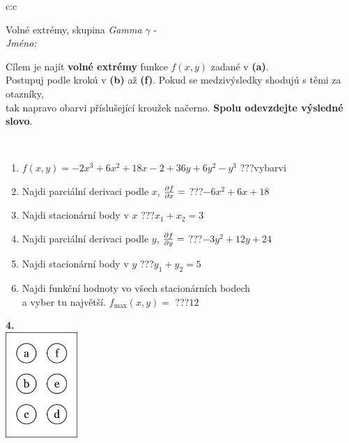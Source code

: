 \documentclass[10pt]{report}
\begin{document}
\begin{tabular}{c:c}
\begin{minipage}[c][104.5mm][t]{0.5\linewidth}
\begin{center}
\vspace{7mm}
{\huge Volné extrémy, skupina \textit{Gamma $\gamma$} -}\\[5mm]
\textit{Jméno:}\phantom{xxxxxxxxxxxxxxxxxxxxxxxxxxxxxxxxxxxxxxxxxxxxxxxxxxxxxxxxxxxxxxxxx}\\[5mm]
\begin{minipage}{0.95\linewidth}
\begin{center}
Cílem je najít \textbf{volné extrémy} funkce $f(x,y)$ zadané v \textbf{(a)}.\\Postupuj podle krokú v \textbf{(b)} až \textbf{(f)}. Pokud se medzivýsledky shodujú s těmi za otazníky,\\tak napravo obarvi příslušející kroužek načerno. \textbf{Spolu odevzdejte výsledné slovo}.
\end{center}
\end{minipage}
\\[1mm]
\begin{minipage}{0.79\linewidth}
\begin{center}
\begin{varwidth}{\linewidth}
\begin{enumerate}
\normalsize
\item $f(x,y)=-2x^3+6x^2+18x-2+36y+6y^2-y^3$\quad \dotfill\; ???\;\dotfill \quad vybarvi
\item Najdi parciální derivaci podle $x$, $\pdv{f}{x}=$\quad \dotfill\; ???\;\dotfill \quad $-6x^2+6x+18$
\item Najdi stacionární body v $x$\quad \dotfill\; ???\;\dotfill \quad $x_1+x_2=3$
\item Najdi parciální derivaci podle $y$, $\pdv{f}{y}=$\quad \dotfill\; ???\;\dotfill \quad $-3y^2+12y+24$
\item Najdi stacionární body v $y$\quad \dotfill\; ???\;\dotfill \quad $y_1+y_2=5$
\item Najdi funkční hodnoty vo všech stacionárních bodech \\ \phantom{xxxxxx} a vyber tu najvětší. $f_{\text{max}}(x,y)=$\quad \dotfill\; ???\;\dotfill \quad $12$
\end{enumerate}
\end{varwidth}
\end{center}
\end{minipage}
\begin{minipage}{0.20\linewidth}
\begin{center}
{\Huge\bfseries 4.} \\[2mm]
\includegraphics[height=40mm]{../images/braille.png}

\end{center}
\end{minipage}
\end{center}
\end{minipage}
\end{tabular}
\end{document}
